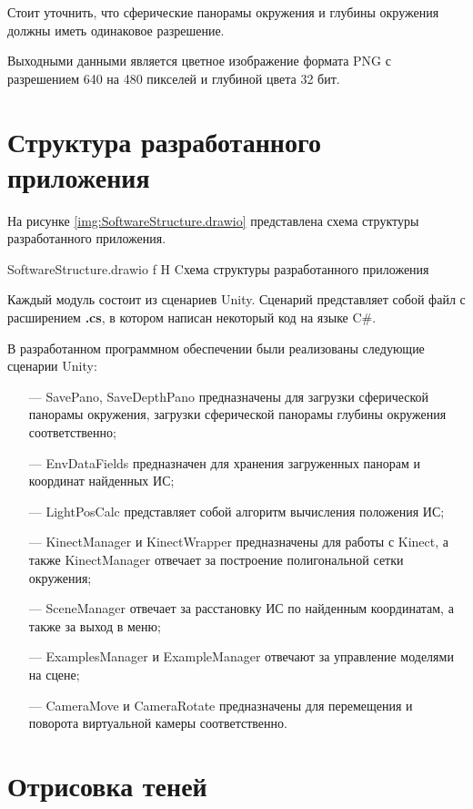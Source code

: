 Стоит уточнить, что сферические панорамы окружения и глубины окружения должны иметь одинаковое разрешение.

Выходными данными является цветное изображение формата PNG с разрешением 640 на 480 пикселей и глубиной цвета 32 бит.

\section{Структура разработанного приложения}

На рисунке \ref{img:SoftwareStructure.drawio} представлена схема структуры разработанного приложения.

{SoftwareStructure.drawio}
{f}
{H}
{\textwidth}
{Cхема структуры разработанного приложения}

Каждый модуль состоит из сценариев Unity. Сценарий представляет собой файл с расширением \textbf{.cs}, в котором написан некоторый код на языке C\#.

В разработанном программном обеспечении были реализованы следующие сценарии Unity:

\begin{itemize}
	\item[---] SavePano, SaveDepthPano предназначены для загрузки сферической панорамы окружения, загрузки сферической панорамы глубины окружения соответственно;
	\item[---] EnvDataFields предназначен для хранения загруженных панорам и координат найденных ИС;
	\item[---] LightPosCalc представляет собой алгоритм вычисления положения ИС;
	\item[---] KinectManager и KinectWrapper предназначены для работы с Kinect, а также KinectManager отвечает за построение полигональной сетки окружения;
	\item[---] SceneManager отвечает за расстановку ИС по найденным координатам, а также за выход в меню;
	\item[---] ExamplesManager и ExampleManager отвечают за управление моделями на сцене;
	\item[---] CameraMove и CameraRotate предназначены для перемещения и поворота виртуальной камеры соответственно.
\end{itemize}

\section{Отрисовка теней}

